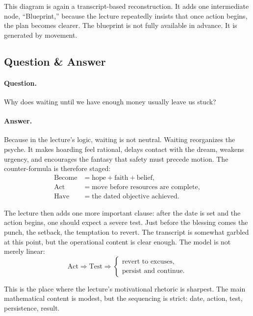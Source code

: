 This diagram is again a transcript-based reconstruction. It adds one intermediate node, ``Blueprint,'' because the lecture repeatedly insists that once action begins, the plan becomes clearer. The blueprint is not fully available in advance. It is generated by movement.

\subsection{Question \& Answer}

\paragraph{Question.} Why does waiting until we have enough money usually leave us stuck?

\paragraph{Answer.} Because in the lecture's logic, waiting is not neutral. Waiting reorganizes the psyche. It makes hoarding feel rational, delays contact with the dream, weakens urgency, and encourages the fantasy that safety must precede motion. The counter-formula is therefore staged:
\begin{align}
\text{Become} &= \text{hope} + \text{faith} + \text{belief}, \\
\text{Act} &= \text{move before resources are complete}, \\
\text{Have} &= \text{the dated objective achieved}.
\end{align}

The lecture then adds one more important clause: after the date is set and the action begins, one should expect a severe test. Just before the blessing comes the punch, the setback, the temptation to revert. The transcript is somewhat garbled at this point, but the operational content is clear enough. The model is not merely linear:
\begin{equation}
\text{Act} \Longrightarrow \text{Test} \Longrightarrow
\begin{cases}
\text{revert to excuses},\\
\text{persist and continue}.
\end{cases}
\end{equation}

This is the place where the lecture's motivational rhetoric is sharpest. The main mathematical content is modest, but the sequencing is strict: date, action, test, persistence, result.

